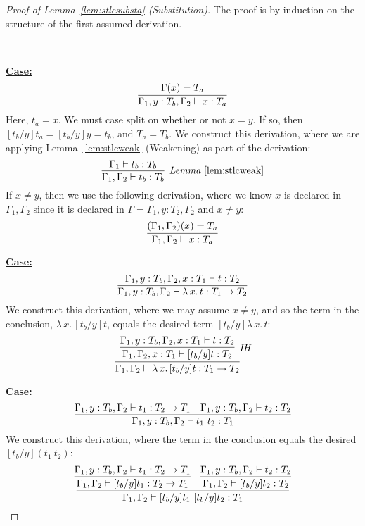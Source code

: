 \documentclass{article}
\begin{document}
\begin{proof}[Proof of Lemma~\ref{lem:stlcsubsta} (Substitution)]
The proof is by induction on the structure of the first assumed derivation.

\ 

\noindent \underline{\textbf{Case:}}
\[
\infer{\Gamma_1,y:T_b,\Gamma_2\vdash x : T_a}{\Gamma(x) = T_a} 
\]
\noindent Here, $t_a = x$.  We must case split on whether or not $x =
y$.  If so, then $[t_b/y]t_a = [t_b/y]y = t_b$, and $T_a = T_b$.  We
construct this derivation, where we are applying
Lemma~\ref{lem:stlcweak} (Weakening) as part of the derivation:
\[
\infer[\textit{Lemma}~\ref{lem:stlcweak}]{\Gamma_1,\Gamma_2\vdash t_b:T_b}{\Gamma_1\vdash t_b:T_b}
\]
\noindent If $x\neq y$, then we use the following derivation, where we know $x$ is declared
in $\Gamma_1,\Gamma_2$ since it is declared in $\Gamma = \Gamma_1,y:T_2,\Gamma_2$ and
$x\neq y$:
\[
\infer{\Gamma_1,\Gamma_2\vdash x : T_a}{(\Gamma_1,\Gamma_2)(x) = T_a} 
\]

\noindent \underline{\textbf{Case:}}
\[
\infer{\Gamma_1,y:T_b,\Gamma_2\vdash \lambda\,x.\,t : T_1\to T_2}{\Gamma_1,y:T_b,\Gamma_2,x:T_1\vdash t:T_2}
\]
\noindent We construct this derivation, where we may assume $x\neq y$, and so the term in
the conclusion, $\lambda\,x.\,[t_b/y]t$, equals the desired term $[t_b/y]\lambda\,x.\,t$:
\[
\infer{\Gamma_1,\Gamma_2\vdash \lambda\,x.\,[t_b/y]t : T_1\to T_2}
      {\infer[\textit{IH}]{\Gamma_1,\Gamma_2,x:T_1\vdash [t_b/y]t:T_2}{\Gamma_1,y:T_b,\Gamma_2,x:T_1\vdash t:T_2}}
\]

\noindent\underline{\textbf{Case:}}
\[
\infer{\Gamma_1,y:T_b,\Gamma_2\vdash t_1\ t_2 : T_1}
      {\Gamma_1,y:T_b,\Gamma_2\vdash t_1 : T_2 \to T_1 &
       \Gamma_1,y:T_b,\Gamma_2\vdash t_2 : T_2}
\]
\noindent We construct this derivation, where the term in the conclusion equals
the desired $[t_b/y](t_1\ t_2)$:
\[
\infer{\Gamma_1,\Gamma_2\vdash [t_b/y]t_1\ [t_b/y]t_2 : T_1}
      {\infer{\Gamma_1,\Gamma_2\vdash [t_b/y]t_1 : T_2 \to T_1}{\Gamma_1,y:T_b,\Gamma_2\vdash t_1 : T_2 \to T_1} &
       \infer{\Gamma_1,\Gamma_2\vdash [t_b/y]t_2 : T_2}{\Gamma_1,y:T_b,\Gamma_2\vdash t_2 : T_2}}
\]

\end{proof}
\end{document}
